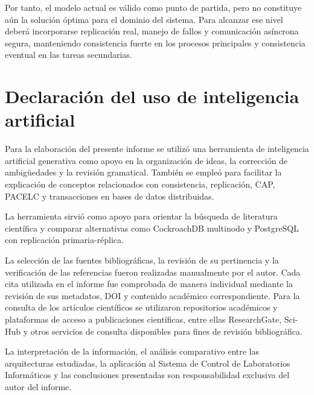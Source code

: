 \documentclass[conference]{IEEEtran}
\begin{document}
Por tanto, el modelo actual es válido como punto de partida, pero no constituye aún la solución óptima para el dominio del sistema. Para alcanzar ese nivel deberá incorporarse replicación real, manejo de fallos y comunicación asíncrona segura, manteniendo consistencia fuerte en los procesos principales y consistencia eventual en las tareas secundarias.

\section*{Declaración del uso de inteligencia artificial}
Para la elaboración del presente informe se utilizó una herramienta de inteligencia artificial generativa como apoyo en la organización de ideas, la corrección de ambigüedades y la revisión gramatical. También se empleó para facilitar la explicación de conceptos relacionados con consistencia, replicación, CAP, PACELC y transacciones en bases de datos distribuidas.

La herramienta sirvió como apoyo para orientar la búsqueda de literatura científica y comparar alternativas como CockroachDB multinodo y PostgreSQL con replicación primaria-réplica.

La selección de las fuentes bibliográficas, la revisión de su pertinencia y la verificación de las referencias fueron realizadas manualmente por el autor. Cada cita utilizada en el informe fue comprobada de manera individual mediante la revisión de sus metadatos, DOI y contenido académico correspondiente. Para la consulta de los artículos científicos se utilizaron repositorios académicos y plataformas de acceso a publicaciones científicas, entre ellas ResearchGate, Sci-Hub y otros servicios de consulta disponibles para fines de revisión bibliográfica.

La interpretación de la información, el análisis comparativo entre las arquitecturas estudiadas, la aplicación al Sistema de Control de Laboratorios Informáticos y las conclusiones presentadas son responsabilidad exclusiva del autor del informe.
\end{document}
